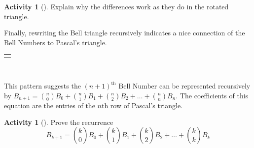 \documentclass[10pt,]{book}
\theoremstyle{plain}
\theoremstyle{definition}
\theoremstyle{definition}
\theoremstyle{definition}
\newtheorem{activity}[project]{Activity}
\numberwithin{equation}{chapter}
\newlength{\panelmax}
\begin{document}
\begin{activity}[]\label{activity-293}
\hypertarget{p-1478}{}%
Explain why the differences work as they do in the rotated triangle.%
\end{activity}
\hypertarget{p-1479}{}%
Finally, rewriting the Bell triangle recursively indicates a nice connection of the Bell Numbers to Pascal's triangle.%
{%
\setlength{\panelmax}{0pt}
\ifdefined\panelboxAtabular\else\newsavebox{\panelboxAtabular}\fi%
\ifdefined\phAtabular\else\newlength{\phAtabular}\fi%
\setlength{\phAtabular}{\ht\panelboxAtabular+\dp\panelboxAtabular}
\settototalheight{\phAtabular}{\usebox{\panelboxAtabular}}
\setlength{\panelmax}{\maxof{\panelmax}{\phAtabular}}
\leavevmode%
\setlength{\tabcolsep}{0\linewidth}
\par\medskip\noindent
\begin{tabular}{@{}*{1}{c}@{}}
\begin{minipage}[c][\panelmax][t]{1\linewidth}\usebox{\panelboxAtabular}\end{minipage}\end{tabular}\\
}%
\par
\hypertarget{p-1480}{}%
This pattern suggests the \({(n + 1)}^{\text{th}}\) Bell Number can be represented recursively by \(B_{n + 1} = \binom{n}{0} B_{0} + \binom{n}{1} B_{1} + \binom{n}{2}B_{2} + \ldots + \binom{n}{n} B_{n}\). The coefficients of this equation are the entries of the \(n\)th row of Pascal's triangle.%
\begin{activity}[]\label{act_bellrecurrence}
\hypertarget{p-1481}{}%
Prove the recurrence%
\begin{equation*}
B_{k + 1} = \binom{k}{0} B_{0} + \binom{k}{1} B_{1} + \binom{k}{2}B_{2} + \ldots + \binom{k}{k} B_{k}
\end{equation*}
%
\end{activity}
\end{document}
